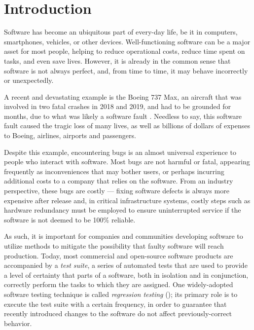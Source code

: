 \chapter{Introduction}\label{chap:intro}

Software has become an ubiquitous part of every-day life, be it in computers, smartphones, vehicles, or other devices.
Well-functioning software can be a major asset for most people, helping to reduce operational costs, reduce time spent on tasks, and even save lives.
However, it is already in the common sense that software is not always perfect, and, from time to time, it may behave incorrectly or unexpectedly.

A recent and devastating example is the Boeing 737 Max, an aircraft that was involved in two fatal crashes in 2018 and 2019, and had to be grounded for months, due to what was likely a software fault \cite{levin_latest_2019}.
Needless to say, this software fault caused the tragic loss of many lives, as well as billions of dollars of expenses to Boeing, airlines, airports and passengers.

Despite this example, encountering bugs is an almost universal experience to people who interact with software.
Most bugs are not harmful or fatal, appearing frequently as inconveniences that may bother users, or perhaps incurring additional costs to a company that relies on the software.
From an industry perspective, these bugs are costly — fixing software defects is always more expensive after release and, in critical infrastructure systems, costly steps such as hardware redundancy must be employed to ensure uninterrupted service if the software is not deemed to be 100\% reliable.

As such, it is important for companies and communities developing software to utilize methods to mitigate the possibility that faulty software will reach production.
Today, most commercial and open-source software products are accompanied by a \textit{test suite}, a series of automated tests that are used to provide a level of certainty that parts of a software, both in isolation and in conjunction, correctly perform the tasks to which they are assigned.
One widely-adopted software testing technique is called \textit{regression testing} (\rt); its primary role is to execute the test suite with a certain frequency, in order to guarantee that recently introduced changes to the software do not affect previously-correct behavior.

